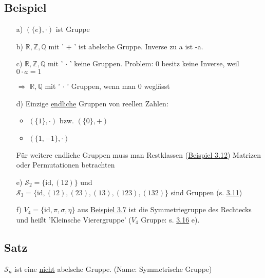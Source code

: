 \documentclass[12pt,titlepage, pdf]{article}
\newcommand{\R}{\mathds{R}}
\newcommand{\uline}[1]{\underline{#1}}
\newcommand{\id}{\textrm{id}}
\renewcommand{\>}{\rightarrow}
\renewcommand{\*}{\cdot}
\begin{document}
	      \subsection{Beispiel}
	      \label{3.10}
	      \begin{itemize}
	      	\item[a)] $(\{e\}, \cdot )$ ist Gruppe
	      	\item[b)] $\R, \mathds{Z}, \mathds{Q}$ mit ' + ' ist abelsche Gruppe. Inverse zu a ist -a.
	      	\item[c)] $\R, \mathds{Z}, \mathds{Q}$ mit ' $\cdot$ ' keine Gruppen. Problem: 0 besitz keine Inverse, weil \\
	      	      $0 \cdot a = 1$\Lightning
	      	\item[$\Rightarrow$]  $\R, \mathds{Q}$ mit ' $\cdot$ ' Gruppen, wenn man 0 weglässt
	      	\item[d)] Einzige \uline{endliche} Gruppen von reellen Zahlen: 
	      	      \begin{itemize}
	      	      	\item $(\{1\}, \cdot )$ bzw. $(\{0\}, + )$
	      	      	\item $(\{1,-1\}, \cdot)$
	      	      \end{itemize}
	      	      Für weitere endliche Gruppen muss man Restklassen (\hyperref[3.12]{Beispiel 3.12}) Matrizen oder Permutationen betrachten
	      	\item[e)] $\mathscr{S}_2 = \{\id, (12)\}$ und \\
	      	      $\mathscr{S}_3 = \{\id, (12), (23),(13),(123),(132)\}$ sind Gruppen (s. \hyperref[3.11]{3.11})
	      	\item[f)] $V_4 = \{\id, \pi, \sigma, \eta \}$ aus \hyperref[3.7]{Beispiel 3.7} ist die Symmetriegruppe des Rechtecks und heißt 'Kleinsche Vierergruppe' ($V_4$ Gruppe: s. \hyperref[3.16]{3.16} e).
	      \end{itemize}
	      \subsection{Satz}
	      \label{3.11}
	      $\mathscr{S}_n$ ist eine \uline{nicht} abelsche Gruppe. (Name: Symmetrische Gruppe) \\
\end{document}
